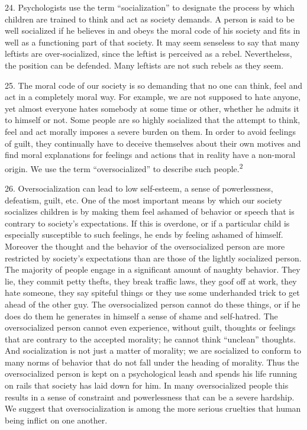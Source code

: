 \documentclass{article}
\begin{document}
\hspace{0.5cm} 24.  Psychologists  use  the  term  “socialization”  to  designate  the  process  by  which  children  are  
trained to think and act as society demands.  A person is said to be well socialized if he believes 
in and obeys the moral code of his society and fits in well as a functioning part of that society.  It 
may seem senseless to say that many leftists are over-socialized, since the leftist is perceived as a 
rebel.  Nevertheless, the position can be defended.  Many leftists are not such rebels as they seem. \vspace{\baselineskip}

25.  The  moral  code  of  our  society  is  so  demanding  that  no  one  can  think,  feel  and  act  in  a  
completely moral way.   For  example, we are not supposed to hate anyone,  yet almost everyone 
hates somebody at some time or other, whether he admits it to himself or not.  Some people are so 
highly  socialized  that  the  attempt  to  think,  feel  and  act  morally  imposes  a  severe  burden  on  
them.  In order to avoid feelings of guilt, they continually have to deceive themselves about their 
own motives and find moral explanations for feelings and actions that in reality have a non-moral 
origin.  We use the term “oversocialized” to describe such people.\textsuperscript{2} \vspace{\baselineskip}

26.  Oversocialization  can  lead  to  low  self-esteem,  a  sense  of  powerlessness,  defeatism,  guilt,  
etc.  One of the most important means by which our society socializes children is by making them 
feel ashamed of behavior or speech that is contrary to society’s expectations.  If this is overdone, 
or  if  a  particular  child  is  especially  susceptible  to  such  feelings,  he  ends  by  feeling  ashamed  of  
himself.  Moreover the thought and the behavior of the oversocialized person are more restricted 
by society’s expectations than are those of the lightly socialized person.  The majority of people 
engage in a significant amount of naughty behavior.  They lie, they commit petty thefts, they break 
traffic laws, they goof off at work, they hate someone, they say spiteful things or they use some 
underhanded trick to get ahead of the other guy.  The oversocialized person cannot do these things, 
or if he does do them he generates in himself a sense of shame and self-hatred.  The oversocialized 
person cannot even experience, without guilt, thoughts or feelings that are contrary to the accepted 
morality; he cannot think “unclean” thoughts.  And socialization is not just a matter of morality; 
we  are  socialized  to  conform  to  many  norms  of  behavior  that  do  not  fall  under  the  heading  of  
morality.   Thus  the  oversocialized  person  is  kept  on  a  psychological  leash  and  spends  his  life  
running on rails that society has laid down for him.  In many oversocialized people this results in 
a  sense  of  constraint  and  powerlessness  that  can  be  a  severe  hardship.   We  suggest  that  
oversocialization is among the more serious cruelties that human being inflict on one another. \vspace{\baselineskip} \newpage
\end{document}
